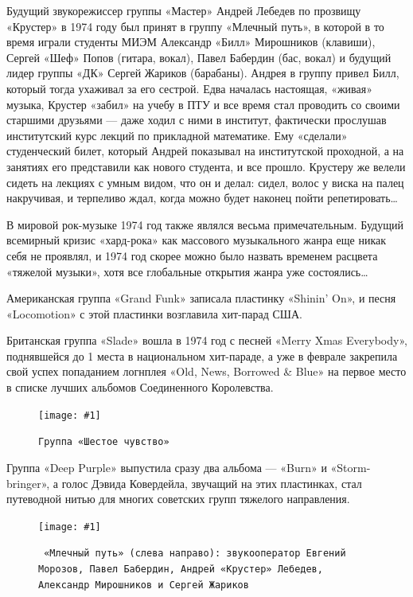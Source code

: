 \documentclass[16pt,a5paper]{book}
\newcommand{\myincludegraphics}[1]{\texttt{[image: \#1]}}
\begin{document}
Будущий звукорежиссер группы «Мастер» Андрей Лебедев по прозвищу «Крустер» в 1974 году был принят в группу «Млечный
путь», в которой в то время играли студенты МИЭМ Александр «Билл» Мирошников (клавиши), Сергей «Шеф» Попов (гитара,
вокал), Павел Бабердин (бас, вокал) и будущий лидер группы «ДК» Сергей Жариков (барабаны). Андрея в группу привел Билл,
который тогда ухаживал за его сестрой. Едва началась настоящая, «живая» музыка, Крустер «забил» на учебу в ПТУ и все
время стал проводить со своими старшими друзьями — даже ходил с ними в институт, фактически прослушав институтский курс
лекций по прикладной математике. Ему «сделали» студенческий билет, который Андрей показывал на институтской проходной,
а на занятиях его представили как нового студента, и все прошло. Крустеру же велели сидеть на лекциях с умным видом, что
он и делал: сидел, волос у виска на палец накручивая, и терпеливо ждал, когда можно будет наконец пойти
репетировать\ldots

В мировой рок-музыке 1974 год также являлся весьма примечательным. Будущий всемирный кризис «хард-рока» как массового
музыкального жанра еще никак себя не проявлял, и 1974 год скорее можно было назвать временем расцвета «тяжелой музыки»,
хотя все глобальные открытия жанра уже состоялись\ldots

Американская группа «Grand Funk» записала пластинку «Shinin' On», и песня «Locomotion» с этой пластинки возглавила
хит-парад США.

Британская группа «Slade» вошла в 1974 год с песней «Merry Xmas Everybody», поднявшейся до 1 места в национальном
хит-параде, а уже в феврале закрепила свой успех попаданием логнплея «Old, News, Borrowed \& Blue» на первое место в
списке лучших альбомов Соединенного Королевства.

\begin{figure}
    \centering
    \myincludegraphics{Image03}
    \caption{\texttt{Группа «Шестое чувство»}}
\end{figure}

Группа «Deep Purple» выпустила сразу два альбома — «Burn» и «Storm-bringer», а голос Дэвида Ковердейла, звучащий на этих
пластинках, стал путеводной нитью для многих советских групп тяжелого направления.

\begin{figure}[h]
    \centering
    \myincludegraphics{Image04}
    \caption{\texttt{
        «Млечный путь» (слева направо): звукооператор Евгений Морозов, Павел Бабердин, Андрей «Крустер» Лебедев,
        Александр Мирошников и Сергей Жариков
    }}
\end{figure}
\end{document}
